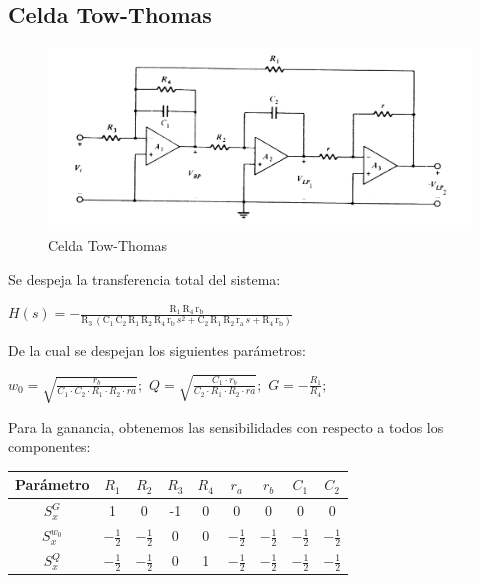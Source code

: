 \documentclass[../tc_tpfinal_main.tex]{subfiles}
\begin{document}
\subsection{Celda Tow-Thomas}

\begin{figure}[H]	
	\centering
	\includegraphics[scale=0.5]{imagenes/tow_thomas_circ.png}
	\caption{Celda Tow-Thomas}
	\label{fig:tpfinal_tow_thomas_circ}
\end{figure}

Se despeja la transferencia total del sistema:\par
\begin{center}
$H(s) = -\frac{\mathrm{R_1}\, \mathrm{R_4}\, \mathrm{r_b}}{\mathrm{R_3}\, \left(\mathrm{C_1}\, \mathrm{C_2}\, \mathrm{R_1}\, \mathrm{R_2}\, \mathrm{R_4}\, \mathrm{r_b}\, s^2 + \mathrm{C_2}\, \mathrm{R_1}\, \mathrm{R_2}\, \mathrm{r_a}\, s + \mathrm{R_4}\, \mathrm{r_b}\right)}
$
\end{center}

De la cual se despejan los siguientes parámetros:\par

\begin{center}
$w_0 = \sqrt{\frac{r_b}{C_1\cdot C_2\cdot R_1\cdot R_2\cdot ra}}; $
$Q = \sqrt{\frac{C_1\cdot r_b}{C_2\cdot R_1\cdot R_2\cdot ra}}; $
$G = -\frac{R_1}{R_4}; $ 
\end{center}

Para la ganancia, obtenemos las sensibilidades con respecto a todos los componentes:\par

 	\begin{table}[H] %
				\centering
 				\begin{tabular}{||c c c c c c c c c||} 
 					\hline
				  Parámetro& $R_1$ & $R_2$ & $R_3$ & $R_4$ & $r_a$ & $r_b$&$C_1$&$C_2$\\ [0.5ex] 
 					\hline\hline
					 $S^G_x$& 1 & 0& -1& 0&0&0&0&0\\
					 $S^{w_0}_x$& $- \frac{1}{2}$ &$- \frac{1}{2}$& 0& 0&$- \frac{1}{2}$&$- \frac{1}{2}$&$- \frac{1}{2}$&$- \frac{1}{2}$\\
					 $S^{Q}_x$&$- \frac{1}{2}$ &$- \frac{1}{2}$& 0& 1&$- \frac{1}{2}$&$- \frac{1}{2}$&$- \frac{1}{2}$&$- \frac{1}{2}$\\[1ex] 
					\hline
				\end{tabular}
			\end{table}
			
\end{document}

